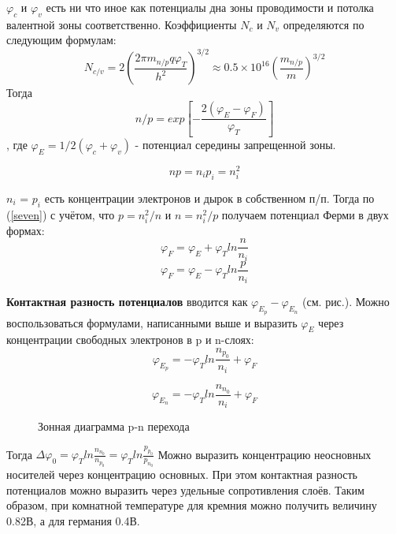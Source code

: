 $\varphi_c$ и $\varphi_v$ есть ни что иное как потенциалы дна зоны проводимости и потолка валентной зоны соответственно. Коэффициенты $N_c$ и $N_v$ определяются по следующим формулам:
$$
N_{c/v} = 2\left(\frac{2\pi m_{n/p}q\varphi_T}{h^2}\right)^{3/2} \approx 0.5\times10^{16}\left(\frac{m_{n/p}}{m}\right)^{3/2}
$$
Тогда
\begin{equation}
n/p = exp\left[-\frac{2(\varphi_E - \varphi_F)}{\varphi_T}\right]
\label{seven}
\end{equation},
где $\varphi_E = 1/2(\varphi_c + \varphi_v)$ - потенциал середины запрещенной зоны.

$$
np = n_ip_i=n_i^2
$$

$n_i$ = $p_i$ есть концентрации электронов и дырок в собственном п/п. Тогда по (\ref{seven}) с учётом, что $p=n_i^2/n$ и $n = n_i^2/p$ получаем потенциал Ферми в двух формах:
$$
\varphi_F = \varphi_E + \varphi_Tln\frac{n}{n_i}
$$
$$
\varphi_F = \varphi_E - \varphi_Tln\frac{p}{n_i}
$$

\textbf{Контактная разность потенциалов} вводится как $\varphi_{E_p} - \varphi_{E_n}$ (см. рис.). Можно воспользоваться формулами, написанными выше и выразить $\varphi_E$ через концентрации свободных электронов в p и n-слоях:
$$
\varphi_{E_p} = -\varphi_Tln\frac{n_{p_0}}{n_i} + \varphi_F
$$

$$
\varphi_{E_n} = -\varphi_Tln\frac{n_{n_0}}{n_i} + \varphi_F
$$ 

\begin{center}
	\begin{figure}[h!]
		\caption{Зонная диаграмма p-n перехода}	
		\label{2D}
	\end{figure}
\end{center}

Тогда $\Delta\varphi_0 = \varphi_Tln\frac{n_{n_0}}{n_{p_0}} = \varphi_Tln\frac{p_{p_0}}{p_{n_0}} $
Можно выразить концентрацию неосновных носителей через концентрацию основных. При этом контактная разность потенциалов можно выразить через удельные сопротивления слоёв. Таким образом, при комнатной температуре для кремния можно получить величину 0.82В, а для германия 0.4В.
\pagebreak
